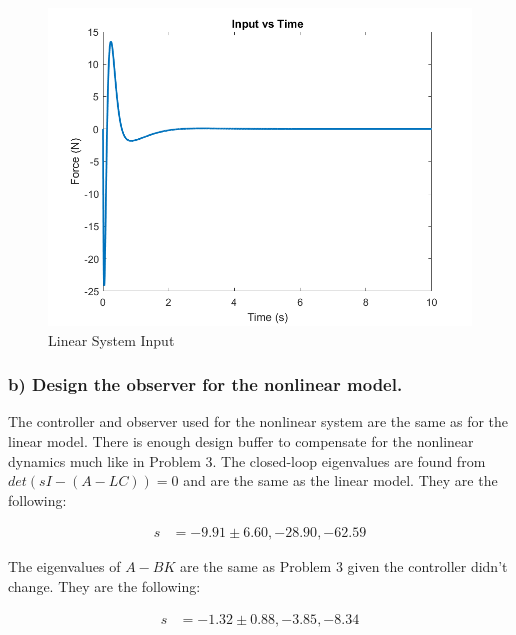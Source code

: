 \begin{figure}[!ht]
    \centering
    \includegraphics[width=\linewidth]{figs/of_lin_input.png}
    \caption{Linear System Input}
    \label{}
\end{figure}

\clearpage

\subsubsection*{b) Design the observer for the nonlinear model.}

The controller and observer used for the nonlinear system are the same as for the linear model. There is enough design buffer to compensate for the nonlinear dynamics much like in Problem 3. The closed-loop eigenvalues are found from $det(sI-(A-LC))=0$ and are the same as the linear model. They are the following:

\begin{equation*}
    \begin{split}
        s & = -9.91\pm6.60, -28.90, -62.59
    \end{split}
\end{equation*}

The eigenvalues of $A-BK$ are the same as Problem 3 given the controller didn't change. They are the following:

\begin{equation*}
    \begin{split}
        s & = -1.32\pm0.88, -3.85, -8.34
    \end{split}
\end{equation*}

